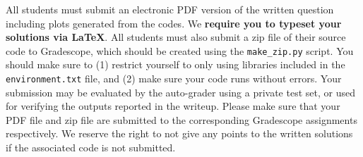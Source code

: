 All students must submit an electronic PDF version of the written question including plots generated from the codes. We
{\bf require you to typeset your solutions via \LaTeX}.
All students must also submit a zip file of
their source code to Gradescope, which should be created using the
\texttt{make\_zip.py} script. You
should make sure to (1) restrict yourself to only using libraries included in
the
\texttt{environment.txt} file, and (2) make sure your code runs without errors.
Your submission may be evaluated by the
auto-grader using a private test set, or used for verifying the outputs reported in the writeup. Please make sure that your PDF file and zip file are submitted to the corresponding Gradescope assignments respectively. We reserve the right to not give any points to the written solutions if the associated code is not submitted.

\vspace{0.1in}
